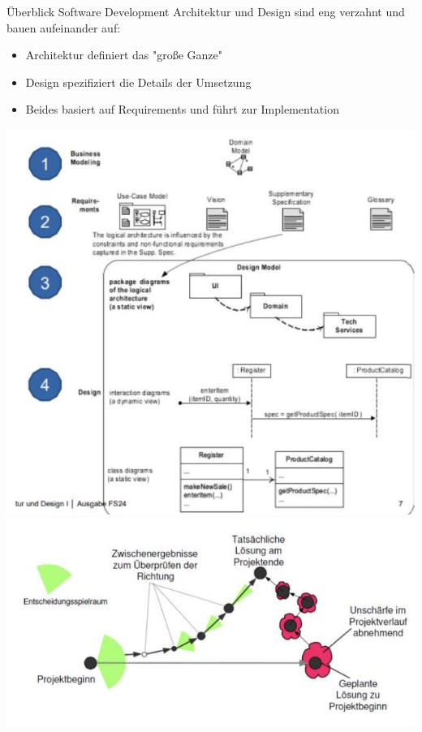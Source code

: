 \begin{concept}{Überblick Software Development}
Architektur und Design sind eng verzahnt und bauen aufeinander auf:
\begin{itemize}
    \item Architektur definiert das "große Ganze"
    \item Design spezifiziert die Details der Umsetzung
    \item Beides basiert auf Requirements und führt zur Implementation
\end{itemize}
\includegraphics[width=\linewidth]{images/2024_12_29_0d1d7b5551ea1b4b41bdg-07(2)}
\includegraphics[width=\linewidth]{images/2024_12_29_0d1d7b5551ea1b4b41bdg-08(1)}
\end{concept}




